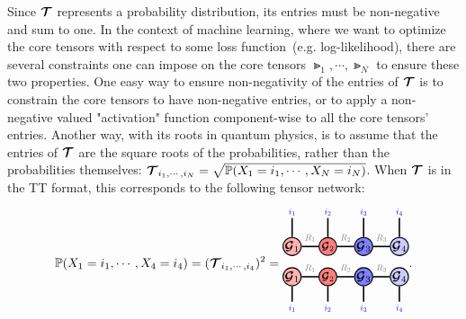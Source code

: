 Since $\bm{\mathcal{T}}$ represents a probability distribution, its entries must be non-negative and sum to one.
In the context of machine learning, where we want to optimize the core tensors with respect to some loss function~(e.g. log-likelihood), there are several constraints one can impose on the core tensors $\Gt_1,\cdots,\Gt_N$ to ensure these two properties. 
One easy way to ensure non-negativity of the entries of $\bm{\mathcal{T}}$ is to constrain the core tensors to have non-negative entries, or to apply a non-negative valued "activation" function component-wise to all the core tensors' entries. Another way, with its roots in quantum physics, is to assume that the entries of $\bm{\mathcal{T}}$ are the square roots of the probabilities, rather than the probabilities themselves: $\bm{\mathcal{T}}_{i_1,\cdots,i_N} = \sqrt{\mathbb{P}(X_1=i_1,\cdots,X_N=i_N)}$. When $\bm{\mathcal{T}}$ is in the TT format, this corresponds to the following tensor network:
$$
\PP(X_1=i_1,\cdots,X_4=i_4) = (\Tt_{i_1,\cdots,i_4})^2 = 
\begin{tikzpicture}[baseline=\baseline]
    \tikzset{tensor/.style = {minimum size = 0.5cm,shape = circle,thick,draw=black,inner sep = 0pt}, edge/.style   = {thick,line width=.4mm},every loop/.style={}}
    \def\y{-0.35}
    \def\x{0}
  \node[tensor,fill=red!30!white] (D) at (\x-1,\y){$\Gt_1$};
  \node[tensor,fill=red!50!white] (A) at (\x,\y){\scalebox{0.85}{$\Gt_2$}};
  \node[tensor,fill=blue!50!white] (B) at (\x+1,\y){$\Gt_3$};
   \node[tensor,fill=blue!20!white] (C) at (\x+2,\y){$\Gt_4$};
   \node[tensor,fill=red!30!white] (G1) at (\x-1,\y+0.85){$\Gt_1$};
  \node[tensor,fill=red!50!white] (G2) at (\x,\y+0.85){\scalebox{0.85}{$\Gt_2$}};
  \node[tensor,fill=blue!50!white] (G3) at (\x+1,\y+0.85){$\Gt_3$};
   \node[tensor,fill=blue!20!white] (G4) at (\x+2,\y+0.85){$\Gt_4$};
    \draw[edge](G1) -- (\x-1,\y+1.65)node [very near end, above]{\scalebox{0.7} {\indcolor{$i_1$}}};
    \draw[edge](G2) -- (\x,\y+1.65)node [very near end, above]{\scalebox{0.7} {\indcolor{$i_2$}}};
    \draw[edge](G3) -- (\x+1,\y+1.65)node [very near end, above]{\scalebox{0.7}{\indcolor{$i_3$}}};
    \draw[edge](G4) -- (\x+2,\y+1.65)node [very near end, above]{\scalebox{0.7}{\indcolor{$i_4$}}};
    \draw[edge](G1) -- (G2)node [midway,above] {\edgelabel{$R_1$}};
    \draw[edge](G2) -- (G3)node [midway,above] {\edgelabel{$R_2$}};
    \draw[edge](G3) -- (G4)node [midway,above] {\edgelabel{$R_3$}};
    \draw[edge](A) -- (\x,\y-0.7)node [very near end, below] {\scalebox{0.7}{\indcolor{$i_2$}}};
    \draw[edge](B) -- (\x+1,\y-0.7)node [very near end, below]{\scalebox{0.7} {\indcolor{$i_3$}}};
    \draw[edge](C) -- (\x+2,\y-0.7)node [very near end, below] {\scalebox{0.7}{\indcolor{$i_4$}}};
     \draw[edge](D) -- (\x-1,\y-0.7)node [very near end, below] {\scalebox{0.7}{\indcolor{$i_1$}}};
    \draw[edge](D) -- (A) node [midway,above] {\edgelabel{$R_1$}};
    \draw[edge](A) -- (B) node [midway,above] {\edgelabel{$R_2$}};
    \draw[edge](B) -- (C) node [midway,above] {\edgelabel{$R_3$}};
\end{tikzpicture}
.
$$

